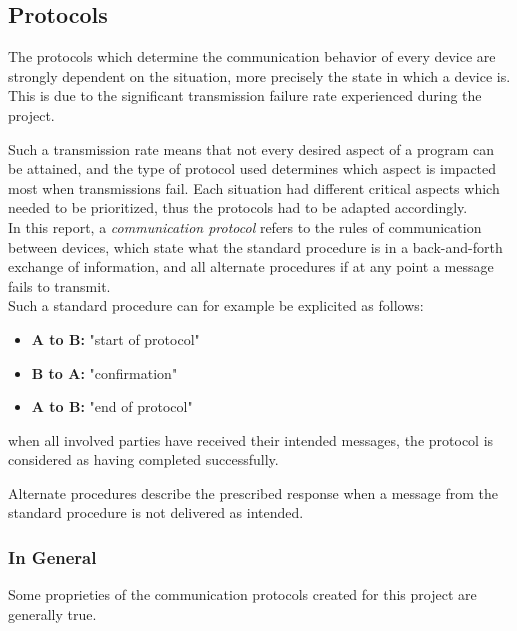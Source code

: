 \subsection{Protocols}

The protocols which determine the communication behavior of every device are strongly dependent on the situation, more precisely the state in which a device is. \\

This is due to the significant transmission failure rate experienced during the project. 

Such a transmission rate means that not every desired aspect of a program can be attained, and the type of protocol used determines which aspect is impacted most when transmissions fail. Each situation had different critical aspects which needed to be prioritized, thus the protocols had to be adapted accordingly.\\

In this report, a \textit{communication protocol} refers to the rules of communication between devices, which state what the standard procedure is in a back-and-forth exchange of information, and all alternate procedures if at any point a message fails to transmit.\\

Such a standard procedure can for example be explicited as follows:
\begin{itemize}
\item[] \textbf{A to B:} "start of protocol"
\item[] \textbf{B to A:} "confirmation"
\item[] \textbf{A to B:} "end of protocol"
\end{itemize}

when all involved parties have received their intended messages, the protocol is considered as having completed successfully.

Alternate procedures describe the prescribed response when a message from the standard procedure is not delivered as intended.

\subsubsection{In General}

Some proprieties of the communication protocols created for this project are generally true.

